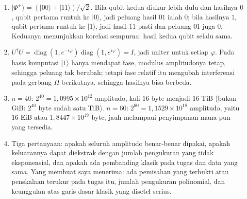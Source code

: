 \begin{enumerate}[label=\textbf{32.\arabic*}]
  \item $|\Phi^{+}\rangle=(|00\rangle+|11\rangle)/\sqrt2$. Bila qubit kedua diukur
        lebih dulu dan hasilnya $0$, qubit pertama runtuh ke $|0\rangle$, jadi
        peluang hasil $01$ ialah $0$; bila hasilnya $1$, qubit pertama runtuh ke
        $|1\rangle$, jadi hasil $11$ pasti dan peluang $01$ juga $0$. Keduanya
        menunjukkan korelasi sempurna: hasil kedua qubit selalu sama.

  \item $U^{\dagger}U=\operatorname{diag}(1,e^{-i\varphi})
        \operatorname{diag}(1,e^{i\varphi})=I$, jadi uniter untuk setiap
        $\varphi$. Pada basis komputasi $|1\rangle$ hanya mendapat fase, modulus
        amplitudonya tetap, sehingga peluang tak berubah; tetapi fase relatif itu
        mengubah interferensi pada gerbang $H$ berikutnya, sehingga hasilnya bisa
        berbeda.

  \item 
$n=40$: $2^{40}=1{,}0995\times10^{12}$ amplitudo, kali $16$ byte menjadi
        $16$ TiB (bukan GiB: $2^{40}$ byte sudah satu TiB). $n=60$:
        $2^{60}=1{,}1529\times10^{18}$ amplitudo, yaitu $16$ EiB atau
        $1{,}8447\times10^{19}$ byte, jauh melampaui penyimpanan mana pun yang
        tersedia.

  \item Tiga pertanyaan: apakah seluruh amplitudo benar-benar dipakai, apakah
        keluarannya dapat diekstrak dengan jumlah pengukuran yang tidak eksponensial,
        dan apakah ada pembanding klasik pada tugas dan data yang sama. Yang membuat
        saya menerima: ada pemisahan yang terbukti atau penskalaan terukur pada tugas
        itu, jumlah pengukuran polinomial, dan keunggulan atas garis dasar klasik
        yang disetel serius.
\end{enumerate}
